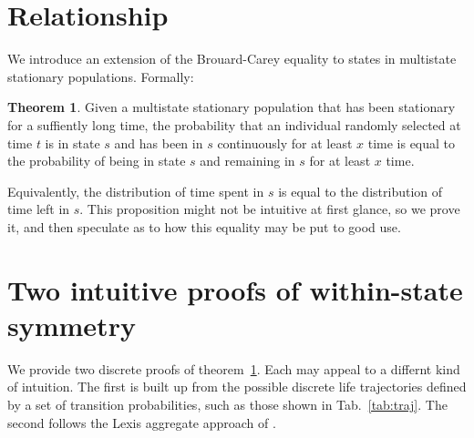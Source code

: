 \documentclass[12pt,oneside,a4paper]{article}
\theoremstyle{definition}
\newtheorem{theorem}{Theorem}[section]
\begin{document}
\section{Relationship}
We introduce an extension of the Brouard-Carey equality to states in multistate stationary populations.
Formally:

\begin{theorem}
\label{th}
Given a multistate stationary population that has been stationary for a suffiently long time, the probability that an individual randomly selected at time $t$ is in state $s$ and has been in $s$ continuously for at least $x$ time is equal to the probability of being in state $s$ and remaining in $s$ for at least $x$ time.
\end{theorem}

Equivalently, the distribution of time spent in $s$ is equal to the distribution of time left in $s$. This proposition
might not be intuitive at first glance, so we prove it, and then speculate
as to how this equality may be put to good use. 


\section{Two intuitive proofs of within-state symmetry}
\FloatBarrier



We provide two discrete proofs of theorem~\ref{th}. Each may appeal to a differnt kind of intuition. The first is built up from the possible discrete life trajectories defined by a set of transition probabilities, such as those shown in Tab.~\ref{tab:traj}. The second follows the Lexis aggregate approach of \citet{villavicencioRiffeSymmetires2016}.
\end{document}
